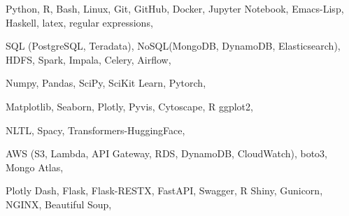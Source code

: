 


\begin{cvskills}


{
Python, R, Bash, Linux, Git, GitHub, Docker, Jupyter Notebook, Emacs-Lisp, Haskell, latex, regular expressions,
}

{
SQL (PostgreSQL, Teradata), NoSQL(MongoDB, DynamoDB, Elasticsearch), HDFS, Spark, Impala, Celery, Airflow,
}

{
Numpy, Pandas, SciPy, SciKit Learn, Pytorch,
}

{
Matplotlib, Seaborn, Plotly, Pyvis, Cytoscape, R ggplot2,
}

{
NLTL, Spacy, Transformers-HuggingFace,
}

{
AWS (S3, Lambda, API Gateway, RDS, DynamoDB, CloudWatch), boto3, Mongo Atlas,
}

{
Plotly Dash, Flask, Flask-RESTX, FastAPI, Swagger, R Shiny, Gunicorn, NGINX, Beautiful Soup,
}













\end{cvskills}
